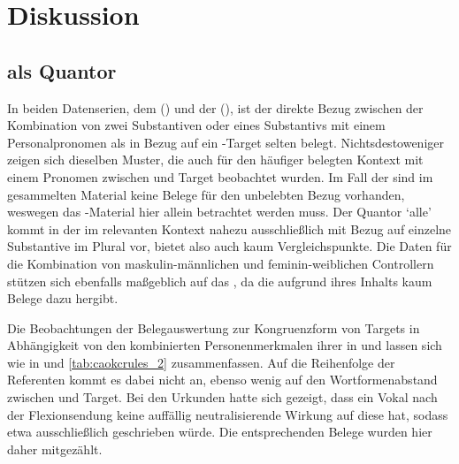 \chapter{Diskussion}
\label{ch:diskussion}

\section{ als Quantor}
\label{sec:beidequant}

In beiden Datenserien, dem 
(\CAO{}) und der  (\KC{}), ist der direkte Bezug zwischen
der Kombination von zwei Substantiven oder eines Substantivs mit einem
Personalpronomen als  in Bezug auf ein -Target
selten belegt. Nichtsdestoweniger zeigen sich dieselben Muster, die auch für
den häufiger belegten Kontext mit einem Pronomen zwischen  und
Target beobachtet wurden. Im Fall der \KC{} sind im gesammelten Material keine
Belege für den unbelebten Bezug vorhanden, weswegen das \CAO{}-Material hier
allein betrachtet werden muss. Der Quantor  `alle'
\autocite[vgl.][606--621]{ksw2} kommt in der \KC{} im relevanten Kontext nahezu
ausschließlich mit Bezug auf einzelne Substan\-tive im Plural vor, bietet also
auch kaum Vergleichspunkte. Die Daten für die Kombination von
maskulin-männlichen und feminin-weiblichen Controllern stützen
sich ebenfalls maßgeblich auf das \CAO{}, da die \KC{} aufgrund ihres Inhalts
kaum Belege dazu hergibt.

Die Beobachtungen der Belegauswertung zur Kongruenzform von Targets in
Abhängigkeit von den kombinierten Personenmerkmalen ihrer  in
 und  lassen sich wie in
 und \ref{tab:caokcrules_2} zusammenfassen. Auf die
Reihenfolge der Referenten kommt es dabei nicht an, ebenso wenig auf den
Wortformenabstand zwischen  und Target. Bei den Urkunden hatte
sich gezeigt, dass ein Vokal nach der Flexionsendung  keine
auffällig neutrali\-sie\-rende Wirkung auf diese hat, sodass etwa
ausschließlich  geschrieben würde. Die entsprechenden Belege wurden
hier daher mitgezählt.

